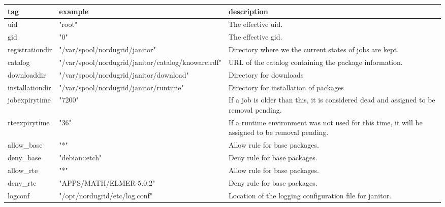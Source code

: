 \begin{landscape}
\begin{table}[!h]
   \begin{center}
	\label{tab:arcConfTags}
	\begin{longtable}{|p{3cm}|p{10cm}||p{10cm}|}
	\hline
	   \textbf{tag}    & \textbf{example}                      & \textbf{description}\\
        \hline
	   uid             & "root"                                & The effective uid. \\
	   gid             & "0"                                   & The effective gid. \\
	   registrationdir & "/var/spool/nordugrid/janitor"        & Directory where we the current states of jobs are kept. \\
	   catalog         & "/var/spool/nordugrid/janitor/catalog/knowarc.rdf"& URL of the catalog containing the package information.\\
	   downloaddir     & "/var/spool/nordugrid/janitor/download" & Directory for downloads \\
	   installationdir & "/var/spool/nordugrid/janitor/runtime"& Directory for installation of packages                   \\
	   jobexpirytime   & "7200"                                & If a job is older than this, it is considered dead and assigned to be removal pending.\\
	   rteexpirytime   & "36"                                  & If a runtime environment was not used for this time, it will be assigned to be removal pending.\\
	   allow\_base     & "*"                                   & Allow rule for base packages. \\
	   deny\_base      & "debian::etch"                        & Deny rule for base packages.\\
	   allow\_rte      & "*"                                   & Allow rule for base packages. \\
	   deny\_rte       & "APPS/MATH/ELMER-5.0.2"               & Deny rule for base packages. \\
	   logconf         & "/opt/nordugrid/etc/log.conf"         & Location of the logging configuration file for janitor.\\
	\hline
	\end{longtable}
   \end{center}
\end{table}
\end{landscape}

